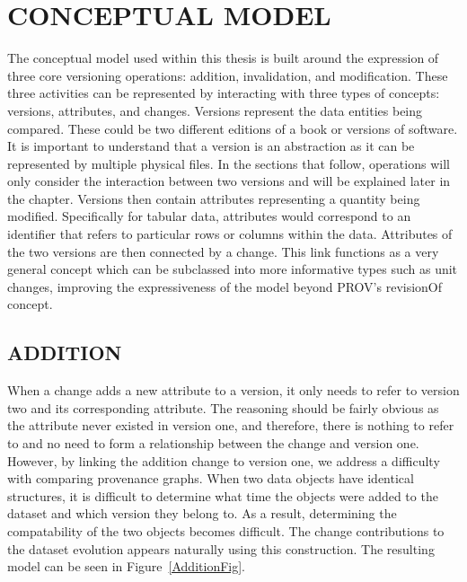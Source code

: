 
\chapter{CONCEPTUAL MODEL}

The conceptual model used within this thesis is built around the expression of three core versioning operations: addition, invalidation, and modification.  These three activities can be represented by interacting with three types of concepts: versions, attributes, and changes.  Versions represent the data entities being compared.  These could be two different editions of a book or versions of software.  It is important to understand that a version is an abstraction as it can be represented by multiple physical files.  In the sections that follow, operations will only consider the interaction between two versions and will be explained later in the chapter.  Versions then contain attributes representing a quantity being modified.  Specifically for tabular data, attributes would correspond to an identifier that refers to particular rows or columns within the data.  Attributes of the two versions are then connected by a change.  This link functions as a very general concept which can be subclassed into more informative types such as unit changes, improving the expressiveness of the model beyond PROV's revisionOf concept.

\section{ADDITION}

When a change adds a new attribute to a version, it only needs to refer to version two and its corresponding attribute.  The reasoning should be fairly obvious as the attribute never existed in version one, and therefore, there is nothing to refer to and no need to form a relationship between the change and version one.  However, by linking the addition change to version one, we address a difficulty with comparing provenance graphs.  When two data objects have identical structures, it is difficult to determine what time the objects were added to the dataset and which version they belong to.  As a result, determining the compatability of the two objects becomes difficult.  The change contributions to the dataset evolution appears naturally using this construction. The resulting model can be seen in Figure~\ref{AdditionFig}.


